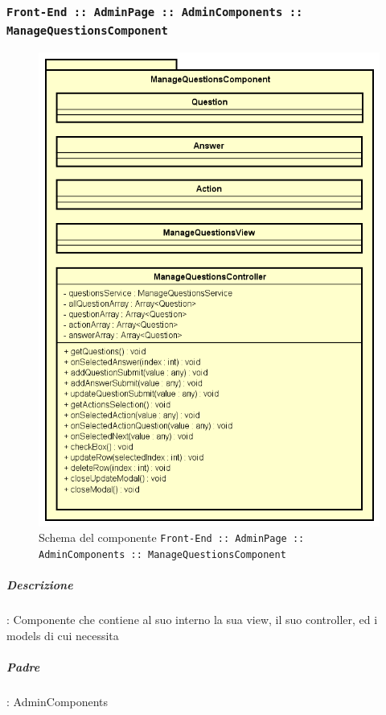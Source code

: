 \documentclass[../DefinizioneDiProdotto_v3.0.0.tex]{subfiles}
\begin{document}
	\subsubsection{\texttt{Front-End :: AdminPage :: AdminComponents :: ManageQuestionsComponent}}
	\begin{figure}[!h]
		\centering
		\includegraphics[scale=0.7]{Architettura/Front-End/AdminPage/AdminComponents/ManageQuestionsComponent.png}
		\caption{Schema del componente \texttt{Front-End :: AdminPage :: AdminComponents :: ManageQuestionsComponent}}
	\end{figure}
			\subparagraph{Descrizione}: Componente che contiene al suo interno la sua view, il suo controller, ed i models di cui necessita
			\subparagraph{Padre}: AdminComponents
\end{document}
